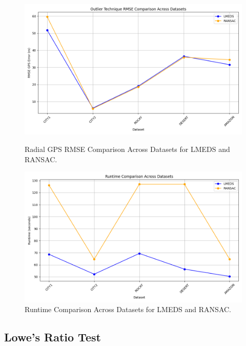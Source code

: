 \begin{figure}[H]
    \centering
    \begin{minipage}{0.45\textwidth}
        \centering
        \includegraphics[width=\textwidth]{./Chapter 4/testresults/ransaclmedsrmse.png}
        \caption{Radial GPS RMSE Comparison Across Datasets for LMEDS and RANSAC.}
        \label{fig:rmse_comparisonlmeds}
    \end{minipage}\hfill
    \begin{minipage}{0.45\textwidth}
        \centering
        \includegraphics[width=\textwidth]{./Chapter 4/testresults/ransaclmedsruntime.png}
        \caption{Runtime Comparison Across Datasets for LMEDS and RANSAC.}
        \label{fig:runtime_comparisonlmeds}
    \end{minipage}
\end{figure}




\subsection{Lowe's Ratio Test}

